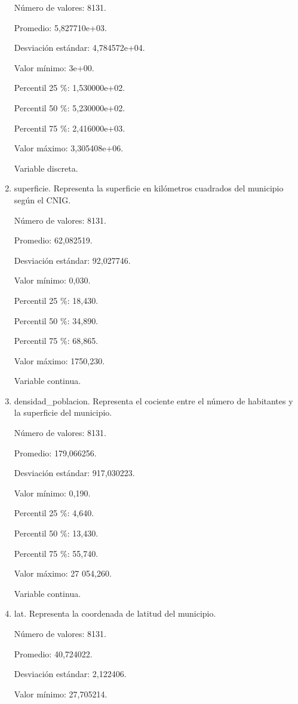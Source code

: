 \begin{enumerate}
	Número de valores: 8131.
	
	Promedio: 5,827710e+03.
	
	Desviación estándar: 4,784572e+04.
	
	Valor mínimo: 3e+00.
	
	Percentil 25 \%: 1,530000e+02.
	
	Percentil 50 \%: 5,230000e+02.
	
	Percentil 75 \%: 2,416000e+03.
	
	Valor máximo: 3,305408e+06.
	
	Variable discreta.

	\item superficie. Representa la superficie en kilómetros cuadrados del municipio según el CNIG.
	
	Número de valores: 8131.
	
	Promedio: 62,082519.
	
	Desviación estándar: 92,027746.
	
	Valor mínimo: 0,030.
	
	Percentil 25 \%: 18,430.
	
	Percentil 50 \%: 34,890.
	
	Percentil 75 \%: 68,865.
	
	Valor máximo: 1750,230.
	
	Variable continua.

	\item densidad\_poblacion. Representa el cociente entre el número de habitantes y la superficie del municipio.
	
	Número de valores: 8131.
	
	Promedio: 179,066256.
	
	Desviación estándar: 917,030223.
	
	Valor mínimo: 0,190.
	
	Percentil 25 \%: 4,640.
	
	Percentil 50 \%: 13,430.
	
	Percentil 75 \%: 55,740.
	
	Valor máximo: 27 054,260.
	
	Variable continua.

	\item lat. Representa la coordenada de latitud del municipio.
	
	Número de valores: 8131.
	
	Promedio: 40,724022.
	
	Desviación estándar: 2,122406.
	
	Valor mínimo: 27,705214.
	

\end{enumerate}
